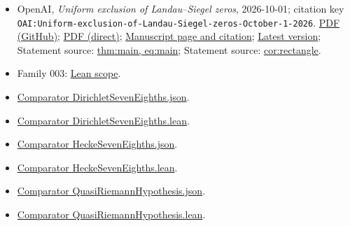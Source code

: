\documentclass[11pt]{article}
\begin{document}
\begin{itemize}
\item OpenAI, \emph{Uniform exclusion of Landau–Siegel zeros}, 2026-10-01; citation key \texttt{OAI:Uniform-exclusion-of-Landau-Siegel-zeros-October-1-2026}. \href{https://github.com/openai/math/blob/adc7f1241b42e322a6451854ab7e4b4c146bf78a/preprints/Uniform-exclusion-of-Landau-Siegel-zeros-October-1-2026/paper.pdf}{PDF (GitHub)}; \href{https://github.com/openai/math/raw/adc7f1241b42e322a6451854ab7e4b4c146bf78a/preprints/Uniform-exclusion-of-Landau-Siegel-zeros-October-1-2026/paper.pdf}{PDF (direct)}; \href{https://github.com/openai/math/blob/adc7f1241b42e322a6451854ab7e4b4c146bf78a/preprints/Uniform-exclusion-of-Landau-Siegel-zeros-October-1-2026/README.md}{Manuscript page and citation}; \href{https://github.com/openai/math/blob/main/preprints/Uniform-exclusion-of-Landau-Siegel-zeros-October-1-2026/paper.pdf}{Latest version}; Statement source: \href{https://github.com/openai/math/blob/adc7f1241b42e322a6451854ab7e4b4c146bf78a/preprints/Uniform-exclusion-of-Landau-Siegel-zeros-October-1-2026/build/paper.tex\#L66}{thm:main, eq:main}; Statement source: \href{https://github.com/openai/math/blob/adc7f1241b42e322a6451854ab7e4b4c146bf78a/preprints/Uniform-exclusion-of-Landau-Siegel-zeros-October-1-2026/build/paper.tex\#L410}{cor:rectangle}.
\item Family 003: \href{https://github.com/openai/math/blob/adc7f1241b42e322a6451854ab7e4b4c146bf78a/lean/docs/003.md}{Lean scope}.
\item \href{https://github.com/openai/math/blob/adc7f1241b42e322a6451854ab7e4b4c146bf78a/lean/ComparatorChallenges/DirichletSevenEighths.json}{Comparator DirichletSevenEighths.json}.
\item \href{https://github.com/openai/math/blob/adc7f1241b42e322a6451854ab7e4b4c146bf78a/lean/ComparatorChallenges/DirichletSevenEighths.lean}{Comparator DirichletSevenEighths.lean}.
\item \href{https://github.com/openai/math/blob/adc7f1241b42e322a6451854ab7e4b4c146bf78a/lean/ComparatorChallenges/HeckeSevenEighths.json}{Comparator HeckeSevenEighths.json}.
\item \href{https://github.com/openai/math/blob/adc7f1241b42e322a6451854ab7e4b4c146bf78a/lean/ComparatorChallenges/HeckeSevenEighths.lean}{Comparator HeckeSevenEighths.lean}.
\item \href{https://github.com/openai/math/blob/adc7f1241b42e322a6451854ab7e4b4c146bf78a/lean/ComparatorChallenges/QuasiRiemannHypothesis.json}{Comparator QuasiRiemannHypothesis.json}.
\item \href{https://github.com/openai/math/blob/adc7f1241b42e322a6451854ab7e4b4c146bf78a/lean/ComparatorChallenges/QuasiRiemannHypothesis.lean}{Comparator QuasiRiemannHypothesis.lean}.

\end{itemize}
\end{document}
